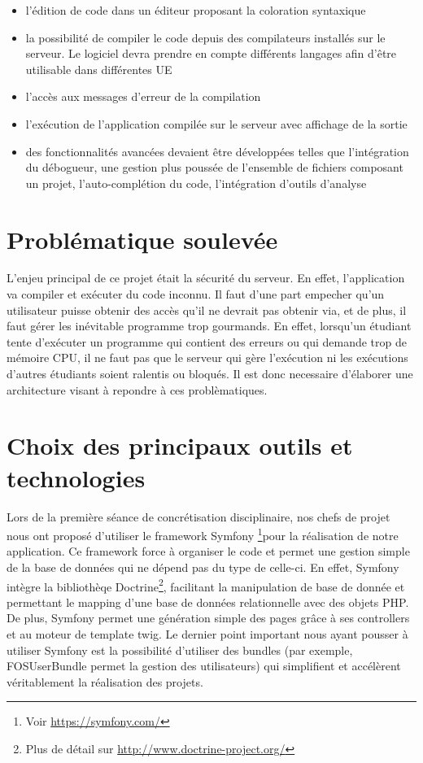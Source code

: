 \begin{itemize}

	\item l'édition de code dans un éditeur proposant la coloration syntaxique
	\item la possibilité de compiler le code depuis des compilateurs installés sur le serveur. Le logiciel devra prendre en compte différents langages afin d’être utilisable dans différentes UE
	\item l'accès aux messages d'erreur de la compilation
	\item l'exécution de l'application compilée sur le serveur avec affichage de la sortie
	\item des fonctionnalités avancées devaient être développées telles que l’intégration du débogueur, une gestion plus poussée de l’ensemble de fichiers composant un projet, l'auto-complétion du code, l'intégration d’outils d’analyse

\end{itemize}


\section{Problématique soulevée}

\par L'enjeu principal de ce projet était la sécurité du serveur. En effet, l'application va compiler et exécuter du code inconnu. Il faut d'une part empecher qu'un utilisateur puisse obtenir des accès qu'il ne devrait pas obtenir via, et de plus, il faut gérer les inévitable programme trop gourmands.  En effet, lorsqu'un étudiant tente d'exécuter un programme qui contient des erreurs ou qui demande trop de mémoire CPU, il ne faut pas que le serveur qui gère l'exécution ni les exécutions d'autres étudiants soient ralentis ou bloqués. Il est donc necessaire d'élaborer une architecture visant à repondre à ces problèmatiques.


\section{Choix des principaux outils et technologies}
\label{sec-principaux-outils}
\par Lors de la première séance de concrétisation disciplinaire, nos chefs de projet nous ont proposé d'utiliser le framework Symfony \footnote{Voir \url{https://symfony.com/}}pour la réalisation de notre application. Ce framework force à organiser le code et permet une gestion simple de la base de données qui ne dépend pas du type de celle-ci. En effet, Symfony intègre la bibliothèqe Doctrine\footnote{Plus de détail sur \url{http://www.doctrine-project.org/}}, facilitant la manipulation de base de donnée et permettant le mapping d'une base de données relationnelle avec des objets PHP. De plus, Symfony permet une génération simple des pages grâce à ses controllers et au moteur de template twig. Le dernier point important nous ayant pousser à utiliser Symfony est la possibilité d'utiliser des bundles (par exemple, FOSUserBundle permet la gestion des utilisateurs) qui simplifient et accélèrent véritablement la réalisation des projets.

